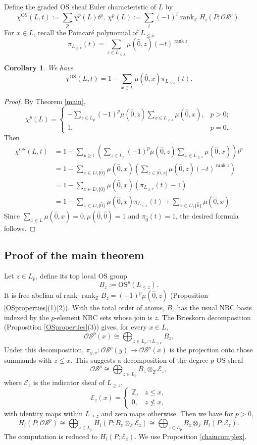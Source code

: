 \documentclass[10pt,a4paper]{amsart}
\numberwithin{equation}{section}
\newtheorem{cor}[thm]{Corollary}
\numberwithin{equation}{section}
\newcommand{\Z}{\mathbb{Z}}
\newcommand{\E}{\mathscr{E}}
\newcommand{\OS}{\mathrm{OS}}
\newcommand{\sOS}{\mathscr{OS}}
\DeclareMathOperator{\rank}{rank}
\begin{document}
Define the graded OS sheaf Euler characteristic of $L$ by
\[
\chi^\OS(L,t):=\sum_{p}\chi^p(L)t^p,~\chi^p(L):=\sum_i(-1)^i\rank_{\Z}H_i(P;\sOS^p).
\]
For $x\in L$, recall the Poincar\'e polynomial of $L_{\leq x}$
\[
\pi_{L_{\leq x}}(t)=\sum_{z\in L_{\leq x}}\mu(\hat{0},z)(-t)^{\rank z}.
\]
\begin{cor}
    We have
    \[
    \chi^\OS(L,t)=1-\sum_{x\in L}\mu(\hat{0},x)\pi_{L_{\leq x}}(t).
    \]
\end{cor}
\begin{proof}
    By Theorem \ref{main},
    \[
    \chi^p(L)=\begin{cases}
        -\sum_{z\in L_p}(-1)^p\mu(\hat 0,z)\sum_{x\in L_{\geq z}}\mu(\hat0,x), & p>0;\\
        1, & p=0.
    \end{cases}
    \]
    Then
    \begin{align*}
        \chi^\OS(L,t)&=1-\sum_{p\geq 1}\left(\sum_{z\in L_p}(-1)^p\mu(\hat 0,z)\sum_{x\in L_{\geq z}}\mu(\hat0,x)\right)t^p\\
        &=1-\sum_{x\in L\setminus\{\hat0\}}\mu(\hat0,x)\left(\sum_{z\in (\hat0,x]}\mu(\hat0 ,z)(-t)^{\rank z}\right)\\
        &=1-\sum_{x\in L\setminus\{\hat0\}}\mu(\hat0,x)(\pi_{L_{\leq x}}(t)-1)\\
        &=1-\sum_{x\in L\setminus\{\hat0\}}\mu(\hat0,x)\pi_{L_{\leq x}}(t)+\sum_{x\in L\setminus\{\hat0\}}\mu(\hat0,x)
    \end{align*}
    Since $\sum_{x\in L}\mu(\hat0,x)=0,\mu(\hat 0,\hat0)=1$ and $\pi_{\hat0}(t)=1$, the desired formula follows.
\end{proof}

\subsection{Proof of the main theorem}
Let $z\in L_p$, define its top local OS group
\[
B_z:=\OS^p(L_{\leq z}).
\]
It is free abelian of rank $\rank_{\Z}B_z=(-1)^{p}\mu(\hat{0},z)$ (Proposition \ref{OSproperties}(1)(2)). With the total order of atoms, $B_z$ has the usual NBC basis indexed by the $p$-element NBC sets whose join is $z$. The Brieskorn decomposition (Proposition \ref{OSproperties}(3)) gives, for every $x\in L$,
\[
\sOS^p(x)\cong \bigoplus_{z\in L_p\cap L_{\leq x}}B_z.
\]
Under this decomposition, $\pi_{y,x}:\sOS^p(y)\to\sOS^p(x)$ is the projection onto those summands with $z\leq x$. This suggests a decomposition of the degree $p$ OS sheaf
\[
\sOS^p\cong \bigoplus_{z\in L_p} B_z\otimes_{\Z}\E_z,
\]
where $\E_z$ is the indicator sheaf of $L_{\geq z}$,
\[
\E_z(x)=\begin{cases}
    \Z, & z\leq x,\\
    0, & z\not\leq x,
\end{cases}
\]
with identity maps within $L_{\geq z}$ and zero maps otherwise. Then we have for $p>0$,
\[
H_i(P;\sOS^p)\cong \bigoplus_{z\in L_p} H_i(P;B_z\otimes_{\Z}\E_z)\cong \bigoplus_{z\in L_p}B_z\otimes_{\Z}H_i(P;\E_z).
\]
The computation is reduced to $H_i(P;\E_z)$. We use Proposition \ref{chaincomplex}.
\end{document}

